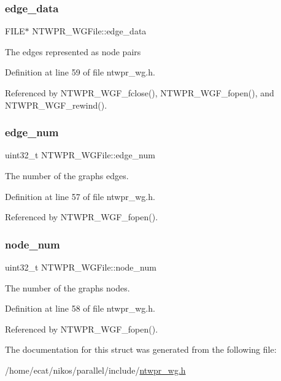 \subsubsection{\texorpdfstring{edge\+\_\+data}{edge\_data}}
{\footnotesize\ttfamily F\+I\+LE$\ast$ N\+T\+W\+P\+R\+\_\+\+W\+G\+File\+::edge\+\_\+data}

The edges represented as node pairs 

Definition at line 59 of file ntwpr\+\_\+wg.\+h.



Referenced by N\+T\+W\+P\+R\+\_\+\+W\+G\+F\+\_\+fclose(), N\+T\+W\+P\+R\+\_\+\+W\+G\+F\+\_\+fopen(), and N\+T\+W\+P\+R\+\_\+\+W\+G\+F\+\_\+rewind().

\mbox{\label{structNTWPR__WGFile_a76b00f9ef8cd1938f7b9ece2db7c686d}} 
\subsubsection{\texorpdfstring{edge\+\_\+num}{edge\_num}}
{\footnotesize\ttfamily uint32\+\_\+t N\+T\+W\+P\+R\+\_\+\+W\+G\+File\+::edge\+\_\+num}

The number of the graph\textquotesingle{}s edges. 

Definition at line 57 of file ntwpr\+\_\+wg.\+h.



Referenced by N\+T\+W\+P\+R\+\_\+\+W\+G\+F\+\_\+fopen().

\mbox{\label{structNTWPR__WGFile_a473237730653419df2494e0f2f52995c}} 
\subsubsection{\texorpdfstring{node\+\_\+num}{node\_num}}
{\footnotesize\ttfamily uint32\+\_\+t N\+T\+W\+P\+R\+\_\+\+W\+G\+File\+::node\+\_\+num}

The number of the graph\textquotesingle{}s nodes. 

Definition at line 58 of file ntwpr\+\_\+wg.\+h.



Referenced by N\+T\+W\+P\+R\+\_\+\+W\+G\+F\+\_\+fopen().



The documentation for this struct was generated from the following file\+:\begin{DoxyCompactItemize}
\item 
/home/ecat/nikos/parallel/include/\mbox{\hyperlink{ntwpr__wg_8h}{ntwpr\+\_\+wg.\+h}}\end{DoxyCompactItemize}
